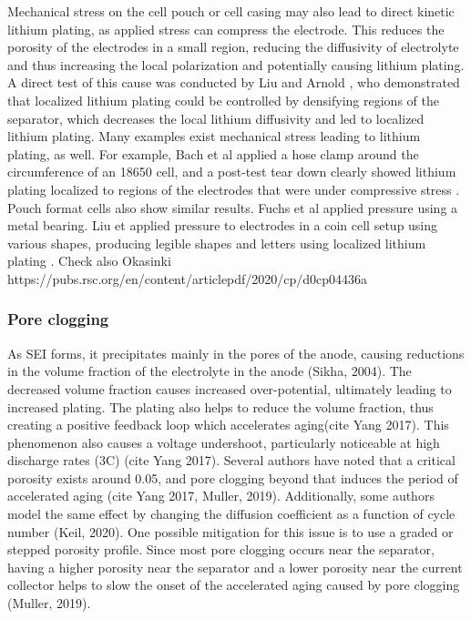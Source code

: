 \documentclass{article}
\begin{document}
Mechanical stress on the cell pouch or cell casing may also lead to direct kinetic lithium plating, as applied stress can compress the electrode. This reduces the porosity of the electrodes in a small region, reducing the diffusivity of electrolyte and thus increasing the local polarization and potentially causing lithium plating. A direct test of this cause was conducted by Liu and Arnold \cite{liu_effects_2020}, who demonstrated that localized lithium plating could be controlled by densifying regions of the separator, which decreases the local lithium diffusivity and led to localized lithium plating. Many examples exist mechanical stress leading to lithium plating, as well. For example, Bach et al applied a hose clamp around the circumference of an 18650 cell, and a post-test tear down clearly showed lithium plating localized to regions of the electrodes that were under compressive stress \cite{bach_nonlinear_2016}. Pouch format cells also show similar results. Fuchs et al \cite{fuchs_post-mortem_2019} applied pressure using a metal bearing. Liu et applied pressure to electrodes in a coin cell setup using various shapes, producing legible shapes and letters using localized lithium plating \cite{liu_size_2018}.
Check also Okasinki https://pubs.rsc.org/en/content/articlepdf/2020/cp/d0cp04436a

\subsubsection{Pore clogging}
As SEI forms, it precipitates mainly in the pores of the anode, causing reductions in the volume fraction of the electrolyte in the anode (Sikha, 2004). The decreased volume fraction causes increased over-potential, ultimately leading to increased plating. The plating also helps to reduce the volume fraction, thus creating a positive feedback loop which accelerates aging(cite Yang 2017). This phenomenon also causes a voltage undershoot, particularly noticeable at high discharge rates (3C) (cite Yang 2017). Several authors have noted that a critical porosity exists around 0.05, and pore clogging beyond that induces the period of accelerated aging (cite Yang 2017, Muller, 2019). Additionally, some authors model the same effect by changing the diffusion coefficient as a function of cycle number (Keil, 2020). One possible mitigation for this issue is to use a graded or stepped porosity profile. Since most pore clogging occurs near the separator, having a higher porosity near the separator and a lower porosity near the current collector helps to slow the onset of the accelerated aging caused by pore clogging (Muller, 2019).
\end{document}
